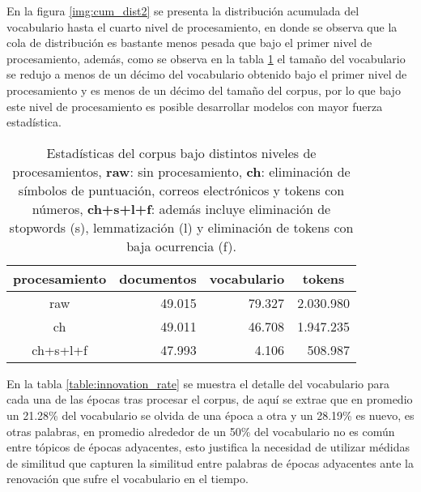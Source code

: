 \documentclass[letterpaper,12pt,oneside]{book} %
\begin{document}
En la figura \ref{img:cum_dist2} se presenta la distribución acumulada del vocabulario hasta el cuarto nivel de procesamiento, en donde se observa que la cola de distribución es bastante menos pesada que bajo el primer nivel de procesamiento, además, como se observa en la tabla \ref{table:processing_stats} el tamaño del vocabulario se redujo a menos de un décimo del vocabulario obtenido bajo el primer nivel de procesamiento y es menos de un décimo del tamaño del corpus, por lo que bajo este nivel de procesamiento es posible desarrollar modelos con mayor fuerza estadística.

\begin{table}[H]
    \begin{tabular}{|c|r|r|r|}
        \hline
        procesamiento & \multicolumn{1}{c|}{documentos} & \multicolumn{1}{c|}{vocabulario} & \multicolumn{1}{c|}{tokens} \\ \hline
        raw          & 49.015                           & 79.327                            & 2.030.980                     \\ \hline
        ch    & 49.011                           & 46.708                            & 1.947.235                     \\ \hline
        ch+s+l+f      & 47.993                           & 4.106                             & 508.987                      \\ \hline
        \end{tabular}
    \caption{Estadísticas del corpus bajo distintos niveles de procesamientos, \textbf{raw}: sin procesamiento, \textbf{ch}: eliminación de símbolos de puntuación, correos electrónicos y tokens con números, \textbf{ch+s+l+f}: además incluye eliminación de stopwords (s), lemmatización (l) y eliminación de tokens con baja ocurrencia (f).}
    \label{table:processing_stats}
\end{table}

En la tabla \ref{table:innovation_rate} se muestra el detalle del vocabulario para cada una de las épocas tras procesar el corpus, de aquí se extrae que en promedio un 21.28\% del vocabulario se olvida de una época a otra y un 28.19\% es nuevo, es otras palabras, en promedio alrededor de un 50\% del vocabulario no es común entre tópicos de épocas adyacentes, esto justifica la necesidad de utilizar médidas de similitud que capturen la similitud entre palabras de épocas adyacentes ante la renovación que sufre el vocabulario en el tiempo.
\end{document}
